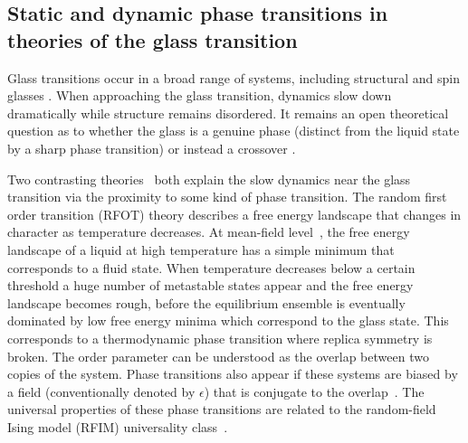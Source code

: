 \documentclass{iopart}
\begin{document}
\subsection{Static and dynamic phase transitions in theories of the glass transition}

Glass transitions occur in a broad range of systems, including structural and spin glasses \cite{berthier2011theoretical}. When approaching the glass transition, dynamics slow down dramatically while structure remains disordered.
It remains an open theoretical question as to whether the glass is a genuine phase (distinct from the liquid state by a sharp phase transition) or instead a crossover  \cite{berthier2011theoretical, arceri2020glasses}.

Two contrasting theories~\cite{biroli2013} both explain the slow dynamics near the glass transition via the proximity to some kind of phase transition.
The random first order transition (RFOT) theory describes a free energy landscape that changes in character as temperature decreases. At mean-field level~\cite{castellani2005spin}, the free energy landscape of a liquid at high temperature has a simple minimum that corresponds to a fluid state. When temperature decreases below a certain threshold a huge number of metastable states appear and the free energy landscape becomes rough, before the equilibrium ensemble is eventually dominated by low free energy minima which correspond to the glass state.  
This corresponds to a thermodynamic phase transition where replica symmetry is broken. 
The order parameter can be understood as the overlap between two copies of the system.  Phase transitions also appear if these systems are biased by a field (conventionally denoted by $\epsilon$) that is conjugate to the overlap~\cite{franz1997phase}.  The universal properties of these phase transitions are related to the random-field Ising model (RFIM) universality class~\cite{biroli2014random,biroli2018random1,biroli2018random2,franz2013glassy,franz2013universality}.
\end{document}
